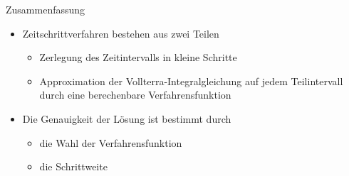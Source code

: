 \begin{frame}
  \begin{center}
  \end{center}
\end{frame}

\begin{frame}{Zusammenfassung}
  \begin{itemize}
  \item Zeitschrittverfahren bestehen aus zwei Teilen
    \begin{itemize}
    \item Zerlegung des Zeitintervalls in kleine Schritte
    \item Approximation der Vollterra-Integralgleichung auf jedem
      Teilintervall durch eine berechenbare Verfahrensfunktion
    \end{itemize}
    \item Die Genauigkeit der Lösung ist bestimmt durch
      \begin{itemize}
      \item die Wahl der Verfahrensfunktion
      \item die Schrittweite
      \end{itemize}
  \end{itemize}
\end{frame}
